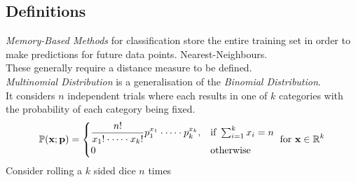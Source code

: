 \documentclass[11pt,a4paper]{article}
\begin{document}
\subsection{Definitions}

\textit{Memory-Based Methods} for classification store the entire training set in order to make predictions for future data points. \eg Nearest-Neighbours.\\
\nb These generally require a distance measure to be defined.\\

\textit{Multinomial Distribution} is a generalisation of the \textit{Binomial Distribution}.\\
It considers $n$ independent trials where each results in one of $k$ categories with the probability of each category being fixed.\\
$$\mathbb{P}(\textbf{x};\textbf{p})=\begin{cases}\dfrac{n!}{x_1!\cdot\dots\cdot x_k!}p_1^{x_1}\cdot\dots\cdot p_k^{x_k},&\text{if }\sum_{i=1}^kx_i=n\\0&\text{otherwise}\end{cases}\text{ for }\textbf{x}\in\mathbb{R}^k$$
\nb Consider rolling a $k$ sided dice $n$ times
\end{document}
